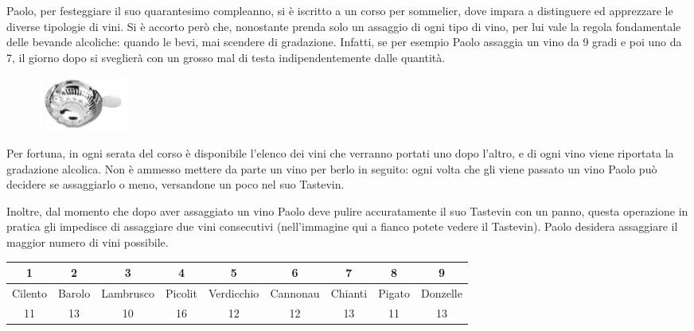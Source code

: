 \renewcommand{\nomebreve}{sommelier}
\renewcommand{\titolo}{Corso per Sommelier}
\renewcommand{\difficolta}{\normalsize \textsc{[Difficoltà D=2]}}

\introduzione{}

Paolo, per festeggiare il suo quarantesimo compleanno, si è iscritto a
un corso per sommelier, dove impara a distinguere ed apprezzare le
diverse tipologie di vini. Si è accorto però che, nonostante prenda
solo un assaggio di ogni tipo di vino, per lui vale la regola
fondamentale delle bevande alcoliche: quando le bevi, mai scendere di
gradazione. Infatti, se per esempio Paolo assaggia un vino da 9 gradi
e poi uno da 7, il giorno dopo si sveglierà con un grosso mal di testa
indipendentemente dalle quantità.

\begin{figure}
  \begin{center}
    \includegraphics[width=3cm]{image01.jpg}
  \end{center}
\end{figure}

Per fortuna, in ogni serata del corso è disponibile l’elenco dei vini
che verranno portati uno dopo l’altro, e di ogni vino viene riportata
la gradazione alcolica. Non è ammesso mettere da parte un vino per
berlo in seguito: ogni volta che gli viene passato un vino Paolo può
decidere se assaggiarlo o meno, versandone un poco nel suo Tastevin.

Inoltre, dal momento che dopo aver assaggiato un vino Paolo deve
pulire accuratamente il suo Tastevin con un panno, questa operazione
in pratica gli impedisce di assaggiare due vini consecutivi
(nell’immagine qui a fianco potete vedere il Tastevin). Paolo desidera
assaggiare il maggior numero di vini possibile.

\vspace{0.3cm}
\begin{tabular}{|c|c|c|c|c|c|c|c|c|}
\hline 1 & 2 & 3 & 4 & 5 & 6 & 7 & 8 & 9 \\
\hline Cilento & Barolo & Lambrusco & Picolit & Verdicchio & Cannonau & Chianti & Pigato & Donzelle \\ 
\hline 11 & 13 & 10 & 16 & 12 & 12 & 13 & 11 & 13\\
\hline
\end{tabular}
\vspace{0.3cm}

